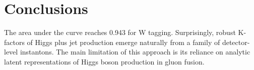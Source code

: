 \section{Conclusions}\label{sec:conclusions}

The area under the curve reaches 0.943 for W tagging. Surprisingly,
robust K-factors of Higgs plus jet production emerge naturally from a
family of detector-level instantons. The main limitation of this
approach is its reliance on analytic latent representations of Higgs
boson production in gluon fusion.

